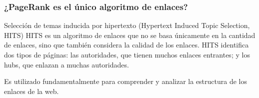 \documentclass[
10pt, %
aspectratio=169, %
]{beamer}
\begin{document}
	\begin{frame}
		
		\frametitle{¿PageRank es el único algoritmo de enlaces?}
		
		
		\begin{alertblock}{Selección de temas inducida por hipertexto (Hypertext Induced Topic Selection, HITS)}
			HITS es un algoritmo de enlaces que no se basa únicamente en la cantidad de enlaces, sino que también considera la calidad de los enlaces. HITS identifica dos tipos de páginas: las autoridades, que tienen muchos enlaces entrantes; y los hubs, que enlazan a muchas autoridades.
		\end{alertblock}
		
		
		
		\vspace{2\baselineskip}
		
		Es utilizado fundamentalmente para comprender y analizar la estructura de los enlaces de la web.
		
	\end{frame}
	
\end{document}
